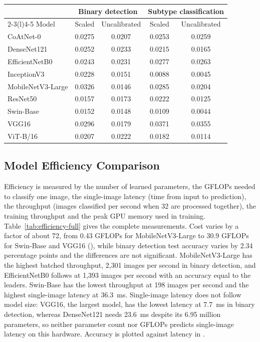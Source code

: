 \documentclass[a4paper,fleqn]{cas-sc}
\begin{document}
\begin{heretable}
\centering
\caption{Expected calibration error of the fold ensembles on the held-out test set, after and before temperature scaling.}
\label{tab:calibration}
\small
\begin{tabular*}{\textwidth}{@{\extracolsep{\fill}}lcccc@{}}
\toprule
 & \multicolumn{2}{c}{Binary detection} & \multicolumn{2}{c}{Subtype classification} \\
\cmidrule(lr){2-3}\cmidrule(l){4-5}
Model & Scaled & Uncalibrated & Scaled & Uncalibrated \\
\midrule
CoAtNet-0 & 0.0275 & 0.0207 & 0.0253 & 0.0259 \\
DenseNet121 & 0.0252 & 0.0233 & 0.0215 & 0.0165 \\
EfficientNetB0 & 0.0243 & 0.0231 & 0.0277 & 0.0263 \\
InceptionV3 & 0.0228 & 0.0151 & 0.0088 & 0.0045 \\
MobileNetV3-Large & 0.0326 & 0.0146 & 0.0285 & 0.0204 \\
ResNet50 & 0.0157 & 0.0173 & 0.0222 & 0.0125 \\
Swin-Base & 0.0152 & 0.0148 & 0.0109 & 0.0044 \\
VGG16 & 0.0296 & 0.0179 & 0.0371 & 0.0355 \\
ViT-B/16 & 0.0207 & 0.0222 & 0.0182 & 0.0114 \\
\bottomrule
\end{tabular*}
\end{heretable}

\subsection{Model Efficiency Comparison}
\label{sec:efficiency}

Efficiency is measured by the number of learned parameters, the GFLOPs needed to classify one image, the single-image latency (time from input to prediction), the throughput (images classified per second when 32 are processed together), the training throughput and the peak GPU memory used in training. Table~\ref{tab:efficiency-full} gives the complete measurements. Cost varies by a factor of about 72, from 0.43 GFLOPs for MobileNetV3-Large to 30.9 GFLOPs for Swin-Base and VGG16 (), while binary detection test accuracy varies by 2.34 percentage points and the differences are not significant. MobileNetV3-Large has the highest batched throughput, 2,301 images per second in binary detection, and EfficientNetB0 follows at 1,393 images per second with an accuracy equal to the leaders. Swin-Base has the lowest throughput at 198 images per second and the highest single-image latency at 36.3~ms. Single-image latency does not follow model size: VGG16, the largest model, has the lowest latency at 7.7~ms in binary detection, whereas DenseNet121 needs 23.6~ms despite its 6.95 million parameters, so neither parameter count nor GFLOPs predicts single-image latency on this hardware. Accuracy is plotted against latency in .
\end{document}

